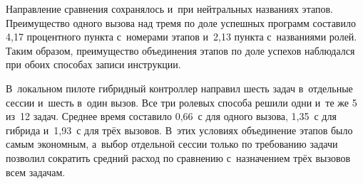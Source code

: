 Направление сравнения сохранялось и~при нейтральных названиях этапов. Преимущество одного вызова над тремя по доле успешных программ составило 4,17 процентного пункта с~номерами этапов и~2,13 пункта с~названиями ролей. Таким образом, преимущество объединения этапов по доле успехов наблюдался при обоих способах записи инструкции.

В~локальном пилоте гибридный контроллер направил шесть задач в~отдельные сессии и~шесть в~один вызов. Все три ролевых способа решили одни и~те же 5 из~12 задач. Среднее время составило 0,66~с для одного вызова, 1,35~с для гибрида и~1,93~с для трёх вызовов. В~этих условиях объединение этапов было самым экономным, а~выбор отдельной сессии только по требованию задачи позволил сократить средний расход по сравнению с~назначением трёх вызовов всем задачам.
